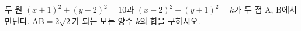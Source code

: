 두 원 $(x+1)^2 + (y-2)^2 = 10$과 $(x-2)^2 + (y+1)^2 = k$가 두 점 $\mathrm{A}$, $\mathrm{B}$에서 만난다.
$\overline{\mathrm{AB}} = 2\sqrt{2}$가 되는 모든 양수 $k$의 합을 구하시오.
